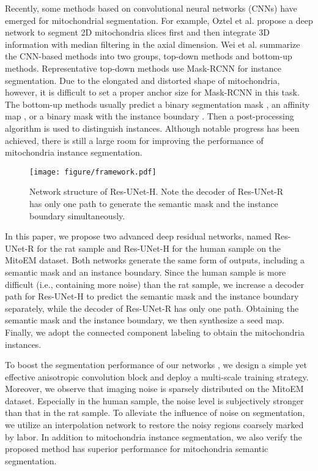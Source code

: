 \documentclass{article}
\begin{document}
Recently, some methods based on convolutional neural networks (CNNs) have emerged for mitochondrial segmentation.
For example, Oztel et al.\cite{oztel2017mitochondria} propose a deep network to segment 2D mitochondria slices first and then integrate 3D information with median filtering in the axial dimension.
Wei et al. \cite{wei2020mitoem} summarize the CNN-based methods  into two groups, top-down methods and bottom-up methods. Representative top-down methods use Mask-RCNN \cite{he2017mask} for instance segmentation. Due to the elongated and distorted shape of mitochondria, however, it is difficult to set a proper anchor size for Mask-RCNN in this task.
The bottom-up methods usually predict a binary segmentation mask \cite{ronneberger2015u}, an affinity map \cite{lee2017superhuman}, or a binary mask  with the instance boundary \cite{chen2016dcan}. Then a post-processing algorithm is used to distinguish instances. Although notable progress has been achieved, there is still a large room for improving the performance of mitochondria instance segmentation.



\begin{figure*}[t]
	\centering
	\texttt{[image: figure/framework.pdf]} \vspace{-0.8em}
	\caption{Network structure of Res-UNet-H. Note the decoder of Res-UNet-R has only one path to generate the semantic mask and the instance boundary simultaneously.}
	\label{fig:framework}
\end{figure*}

In this paper, we propose two advanced deep residual networks, named Res-UNet-R for the rat sample and Res-UNet-H for the human sample on the MitoEM dataset. Both networks generate the same form of outputs, including a semantic mask and an instance boundary. Since the human sample is more difficult (i.e., containing more noise) than the rat sample, we increase a decoder path for Res-UNet-H to predict the semantic mask and the instance boundary separately, while the decoder of Res-UNet-R has only one path. Obtaining the semantic mask and the instance boundary, we then synthesize a seed map. Finally, we adopt the connected component labeling    to obtain the mitochondria instances.

To boost the segmentation performance of our networks , we design a simple yet effective anisotropic convolution block and deploy a multi-scale training strategy.
Moreover, we observe that imaging noise is sparsely distributed on the MitoEM dataset. Especially in the human sample, the noise level is subjectively stronger than that in the rat sample. To alleviate the influence of noise on segmentation, we utilize an interpolation network \cite{niklaus2017video,huang2020learning} to restore the noisy regions coarsely marked by labor.
In addition to mitochondria instance segmentation, we also verify the proposed method has superior performance for mitochondria semantic segmentation.
\end{document}
